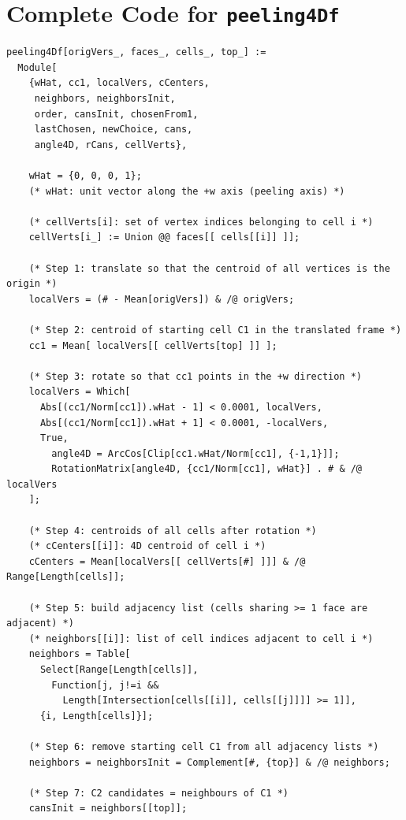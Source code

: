 \documentclass[12pt,a4paper]{article}
\theoremstyle{definition}
\begin{document}
\appendix
\section{Complete Code for \texttt{peeling4Df}}

\begin{lstlisting}
peeling4Df[origVers_, faces_, cells_, top_] :=
  Module[
    {wHat, cc1, localVers, cCenters,
     neighbors, neighborsInit,
     order, cansInit, chosenFrom1,
     lastChosen, newChoice, cans,
     angle4D, rCans, cellVerts},

    wHat = {0, 0, 0, 1};
    (* wHat: unit vector along the +w axis (peeling axis) *)

    (* cellVerts[i]: set of vertex indices belonging to cell i *)
    cellVerts[i_] := Union @@ faces[[ cells[[i]] ]];

    (* Step 1: translate so that the centroid of all vertices is the origin *)
    localVers = (# - Mean[origVers]) & /@ origVers;

    (* Step 2: centroid of starting cell C1 in the translated frame *)
    cc1 = Mean[ localVers[[ cellVerts[top] ]] ];

    (* Step 3: rotate so that cc1 points in the +w direction *)
    localVers = Which[
      Abs[(cc1/Norm[cc1]).wHat - 1] < 0.0001, localVers,
      Abs[(cc1/Norm[cc1]).wHat + 1] < 0.0001, -localVers,
      True,
        angle4D = ArcCos[Clip[cc1.wHat/Norm[cc1], {-1,1}]];
        RotationMatrix[angle4D, {cc1/Norm[cc1], wHat}] . # & /@ localVers
    ];

    (* Step 4: centroids of all cells after rotation *)
    (* cCenters[[i]]: 4D centroid of cell i *)
    cCenters = Mean[localVers[[ cellVerts[#] ]]] & /@ Range[Length[cells]];

    (* Step 5: build adjacency list (cells sharing >= 1 face are adjacent) *)
    (* neighbors[[i]]: list of cell indices adjacent to cell i *)
    neighbors = Table[
      Select[Range[Length[cells]],
        Function[j, j!=i &&
          Length[Intersection[cells[[i]], cells[[j]]]] >= 1]],
      {i, Length[cells]}];

    (* Step 6: remove starting cell C1 from all adjacency lists *)
    neighbors = neighborsInit = Complement[#, {top}] & /@ neighbors;

    (* Step 7: C2 candidates = neighbours of C1 *)
    cansInit = neighbors[[top]];


\end{lstlisting}
\end{document}
